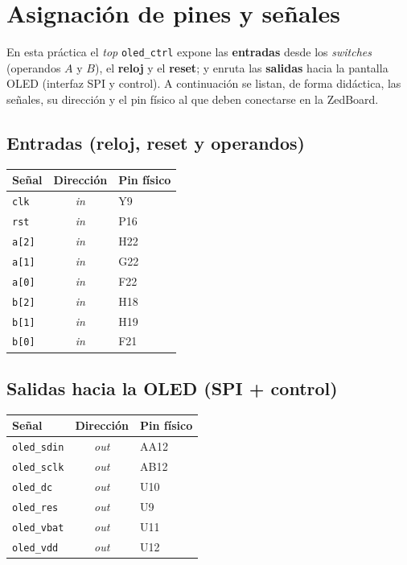 \documentclass[a4paper,12pt]{article}
\begin{document}
\section{Asignación de pines y señales}

En esta práctica el \emph{top} \texttt{oled\_ctrl} expone las \textbf{entradas} desde los \emph{switches} (operandos \(A\) y \(B\)), el \textbf{reloj} y el \textbf{reset}; y enruta las \textbf{salidas} hacia la pantalla OLED (interfaz SPI y control). A continuación se listan, de forma didáctica, las señales, su dirección y el pin físico al que deben conectarse en la ZedBoard.

\subsection*{Entradas (reloj, reset y operandos)}
\begin{center}
\begin{tabular}{lcl}
\toprule
\textbf{Señal} & \textbf{Dirección} & \textbf{Pin físico} \\
\midrule
\texttt{clk}      & \textit{in}  & Y9 \\
\texttt{rst}      & \textit{in}  & P16 \\
\texttt{a[2]}     & \textit{in}  & H22 \\
\texttt{a[1]}     & \textit{in}  & G22 \\
\texttt{a[0]}     & \textit{in}  & F22 \\
\texttt{b[2]}     & \textit{in}  & H18 \\
\texttt{b[1]}     & \textit{in}  & H19 \\
\texttt{b[0]}     & \textit{in}  & F21 \\
\bottomrule
\end{tabular}
\end{center}

\subsection*{Salidas hacia la OLED (SPI + control)}
\begin{center}
\begin{tabular}{lcl}
\toprule
\textbf{Señal} & \textbf{Dirección} & \textbf{Pin físico} \\
\midrule
\texttt{oled\_sdin} & \textit{out} & AA12 \\
\texttt{oled\_sclk} & \textit{out} & AB12 \\
\texttt{oled\_dc}   & \textit{out} & U10 \\
\texttt{oled\_res}  & \textit{out} & U9 \\
\texttt{oled\_vbat} & \textit{out} & U11 \\
\texttt{oled\_vdd}  & \textit{out} & U12 \\
\bottomrule
\end{tabular}
\end{center}
\end{document}
